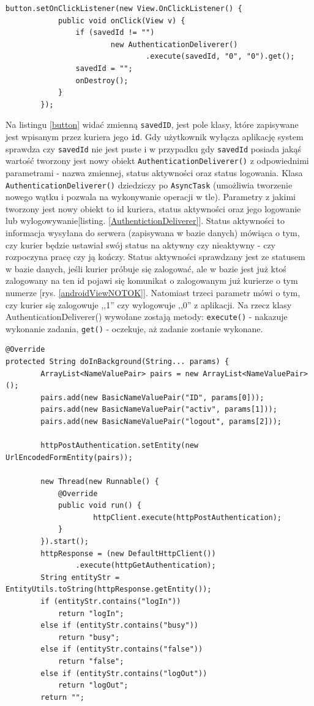 \documentclass[eng,printmode,oneside]{mgr}
\begin{document}
\begin{lstlisting}[caption=Ustawienie właściwości przycisku
``Off'',label=button]
button.setOnClickListener(new View.OnClickListener() {
			public void onClick(View v) {
				if (savedId != "")
						new AuthenticationDeliverer()
								.execute(savedId, "0", "0").get();
				savedId = "";
				onDestroy();
			}
		});
\end{lstlisting}

Na listingu \ref{button} widać zmienną \texttt{savedID}, jest pole klasy, które
zapisywane jest wpisanym przez kuriera jego \texttt{id}. Gdy użytkownik wyłącza
aplikację system sprawdza czy \texttt{savedId} nie jest puste i w przypadku gdy
\texttt{savedId} posiada jakąś wartość tworzony jest nowy obiekt
\texttt{AuthenticationDeliverer()} z odpowiednimi parametrami - nazwa zmiennej, status aktywności oraz status logowania. Klasa
\texttt{AuthenticationDeliverer()} dziedziczy po \texttt{AsyncTask} (umożliwia
tworzenie nowego wątku i pozwala na wykonywanie operacji w tle). Parametry z jakimi tworzony jest
nowy obiekt to id kuriera, status aktywności oraz jego logowanie lub
wylogowywanie[listing. \ref{AuthentictionDeliverer}]. Status aktywności to informacja
wysyłana do serwera (zapisywana w bazie danych) mówiąca o tym, czy kurier będzie ustawiał swój status na aktywny
czy nieaktywny - czy rozpoczyna pracę czy ją kończy. Status aktywności
sprawdzany jest ze statusem w bazie danych, jeśli kurier próbuje się zalogować,
ale w bazie jest już ktoś zalogowany na ten id pojawi się komunikat o
zalogowanym już kurierze o tym numerze [rys. \ref{androidViewNOTOK}]. Natomiast
trzeci parametr mówi o tym, czy kurier się zalogowuje ,,1'' czy wylogowuje ,,0''
z aplikacji. Na rzecz klasy AuthenticationDeliverer() wywołane zostają metody:
\texttt{execute()} - nakazuje wykonanie zadania, \texttt{get()} - oczekuje, aż
zadanie zostanie wykonane.

\begin{lstlisting}[caption=klasa
AuthenticationDeliverer metoda doInBackground,label=AuthentictionDeliverer]
@Override 
protected String doInBackground(String... params) {
		ArrayList<NameValuePair> pairs = new ArrayList<NameValuePair>();
		pairs.add(new BasicNameValuePair("ID", params[0]));
		pairs.add(new BasicNameValuePair("activ", params[1]));
		pairs.add(new BasicNameValuePair("logout", params[2]));

		httpPostAuthentication.setEntity(new UrlEncodedFormEntity(pairs));
		
		new Thread(new Runnable() {
			@Override
			public void run() {
					httpClient.execute(httpPostAuthentication);
			}
		}).start();
		httpResponse = (new DefaultHttpClient())
				.execute(httpGetAuthentication);
		String entityStr = EntityUtils.toString(httpResponse.getEntity());
		if (entityStr.contains("logIn"))
			return "logIn";
		else if (entityStr.contains("busy"))
			return "busy";
		else if (entityStr.contains("false"))
			return "false";
		else if (entityStr.contains("logOut"))
			return "logOut";
		return "";
\end{lstlisting}
\end{document}
